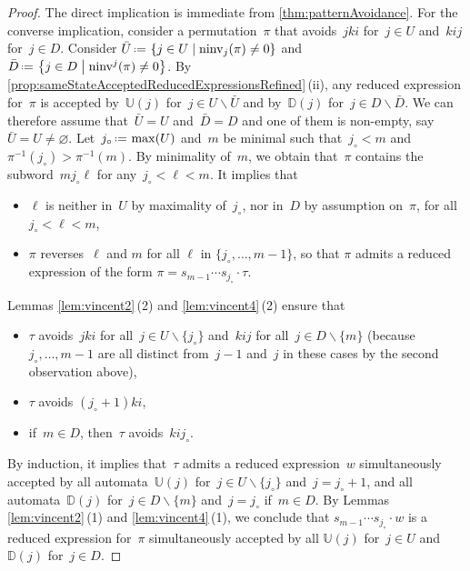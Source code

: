 \documentclass{amsart}
\newcommand{\set}[2]{\left\{ #1 \;\middle|\; #2 \right\}} %
\newcommand{\ssm}{\smallsetminus} %
\newcommand{\eqdef}{\mbox{\,\raisebox{0.2ex}{\scriptsize\ensuremath{\mathrm:}}\ensuremath{=}\,}} %
\DeclareMathOperator{\ninv}{ninv} %
\newcommand{\automatonU}{\mathbb{U}} %
\newcommand{\automatonD}{\mathbb{D}} %
\begin{document}
\begin{proof}
The direct implication is immediate from \cref{thm:patternAvoidance}.
For the converse implication, consider a permutation~$\pi$ that avoids~$jki$ for~$j \in U$ and~$kij$ for~$j \in D$.
Consider $\bar U \eqdef \set{j \in U}{\ninv_j(\pi) \ne 0}$ and~$\bar D \eqdef \set{j \in D}{\ninv^j(\pi) \ne 0}$.
By \cref{prop:sameStateAcceptedReducedExpressionsRefined}\,(ii), any reduced expression for~$\pi$ is accepted by~$\automatonU(j)$ for~$j \in U \ssm \bar U$ and by~$\automatonD(j)$ for~$j \in D \ssm \bar D$.
We can therefore assume that~$\bar U = U$ and~$\bar D = D$ and one of them is non-empty, say~$\bar U = U \ne \varnothing$.
Let~$j_\circ \eqdef \max(U)$ and~$m$ be minimal such that~$j_\circ < m$ and~$\pi^{-1}(j_\circ) > \pi^{-1}(m)$.
By minimality of~$m$, we obtain that~$\pi$ contains the subword~$mj_\circ\ell$ for any~$j_\circ < \ell < m$.
It implies that
\begin{itemize}
\item $\ell$ is neither in~$U$ by maximality of~$j_\circ$, nor in~$D$ by assumption on~$\pi$, for all~$j_\circ < \ell < m$,
\item $\pi$ reverses~$\ell$ and $m$ for all $\ell$ in $\{j_\circ,\dots,m-1\}$, so that $\pi$ admits a reduced expression of the form $\pi = s_{m-1} \cdots s_{j_\circ} \cdot \tau$.
\end{itemize}
Lemmas \ref{lem:vincent2}\,(2) and \ref{lem:vincent4}\,(2) ensure that
\begin{itemize}
\item $\tau$ avoids~$jki$ for all~$j \in U \ssm \{j_\circ\}$ and~$kij$ for all~$j \in D \ssm \{m\}$ (because~$j_\circ, \dots, m-1$ are all distinct from~$j-1$ and~$j$ in these cases by the second observation above),
\item $\tau$ avoids $(j_\circ+1)ki$,
\item if~$m \in D$, then~$\tau$ avoids~$kij_\circ$.
\end{itemize}
By induction, it implies that~$\tau$ admits a reduced expression~$w$ simultaneously accepted by all automata~$\automatonU(j)$ for~$j \in U \ssm \{j_\circ\}$ and~$j = j_\circ + 1$, and all automata~$\automatonD(j)$ for~$j \in D \ssm \{m\}$ and~$j = j_\circ$ if~$m \in D$.
By Lemmas \ref{lem:vincent2}\,(1) and \ref{lem:vincent4}\,(1), we conclude that $s_{m-1} \cdots s_{j_\circ} \cdot w$ is a reduced expression for~$\pi$ simultaneously accepted by all $\automatonU(j)$ for~$j \in U$ and~$\automatonD(j)$ for~$j \in D$.
\end{proof}
\end{document}

